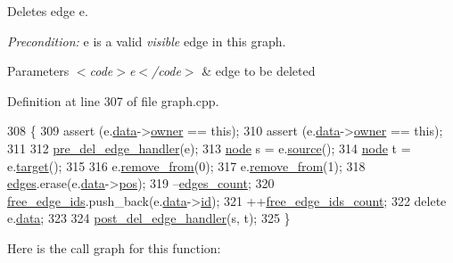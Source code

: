 Deletes edge {\ttfamily e}.

{\itshape Precondition\+:} {\ttfamily e} is a valid {\itshape visible} edge in this graph.


\begin{DoxyParams}{Parameters}
{\em $<$code$>$e$<$/code$>$} & edge to be deleted \\
\hline
\end{DoxyParams}


Definition at line 307 of file graph.\+cpp.


\begin{DoxyCode}
308 \{
309     assert (e.\mbox{\hyperlink{classedge_a0ebb6dfa28b77f47529085049352b436}{data}}->\mbox{\hyperlink{classedge__data_a00436f2956a69cd9dc8e5bfa530e0ce9}{owner}} == \textcolor{keyword}{this});
310     assert (e.\mbox{\hyperlink{classedge_a0ebb6dfa28b77f47529085049352b436}{data}}->\mbox{\hyperlink{classedge__data_a00436f2956a69cd9dc8e5bfa530e0ce9}{owner}} == \textcolor{keyword}{this});
311 
312     \mbox{\hyperlink{classgraph_a2cd0986dc5bcbfdbf0635c39e610784b}{pre\_del\_edge\_handler}}(e);
313     \mbox{\hyperlink{classnode}{node}} s = e.\mbox{\hyperlink{classedge_ae82d5701f7e6f71edc3c8b0e34bcd2b7}{source}}();
314     \mbox{\hyperlink{classnode}{node}} t = e.\mbox{\hyperlink{classedge_a97563b611261478ee19c6ce055f1a3ee}{target}}();
315 
316     e.\mbox{\hyperlink{classedge_abcd4eeaf23327d026beac9ee1d0fa7e9}{remove\_from}}(0);
317     e.\mbox{\hyperlink{classedge_abcd4eeaf23327d026beac9ee1d0fa7e9}{remove\_from}}(1);
318     \mbox{\hyperlink{classgraph_ab5b1c610cca1bcf72b05aacc28a48153}{edges}}.erase(e.\mbox{\hyperlink{classedge_a0ebb6dfa28b77f47529085049352b436}{data}}->\mbox{\hyperlink{classedge__data_a178a8fd40a6ec8139291f96a7807f711}{pos}});
319     --\mbox{\hyperlink{classgraph_af560ff4263ad165c166a46084e781b4a}{edges\_count}};
320     \mbox{\hyperlink{classgraph_a2bef57ea1db5b5541b3cce866de179f0}{free\_edge\_ids}}.push\_back(e.\mbox{\hyperlink{classedge_a0ebb6dfa28b77f47529085049352b436}{data}}->\mbox{\hyperlink{classedge__data_a33597ce417f8d86697b03fc8b6fea526}{id}});
321     ++\mbox{\hyperlink{classgraph_a336be547b5e0ca43b96cf00131e0e1da}{free\_edge\_ids\_count}};
322     \textcolor{keyword}{delete} e.\mbox{\hyperlink{classedge_a0ebb6dfa28b77f47529085049352b436}{data}};
323 
324     \mbox{\hyperlink{classgraph_ab9ac8bcc7288986de69cd467beb33600}{post\_del\_edge\_handler}}(s, t);
325 \}
\end{DoxyCode}
Here is the call graph for this function\+:
\nopagebreak
